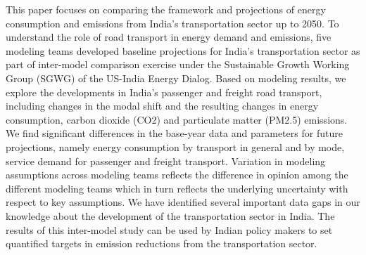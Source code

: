 This paper focuses on comparing the framework and projections of energy consumption and emissions from India's transportation sector up to 2050. To understand the role of road transport in energy demand and emissions, five modeling teams developed baseline projections for India's transportation sector as part of inter-model comparison exercise under the Sustainable Growth Working Group (SGWG) of the US-India Energy Dialog. Based on modeling results, we explore the developments in India's passenger and freight road transport, including changes in the modal shift and the resulting changes in energy consumption, carbon dioxide (CO2) and particulate matter (PM2.5) emissions. We find significant differences in the base-year data and parameters for future projections, namely energy consumption by transport in general and by mode, service demand for passenger and freight transport. Variation in modeling assumptions across modeling teams reflects the difference in opinion among the different modeling teams which in turn reflects the underlying uncertainty with respect to key assumptions. We have identified several important data gaps in our knowledge about the development of the transportation sector in India. The results of this inter-model study can be used by Indian policy makers to set quantified targets in emission reductions from the transportation sector.
